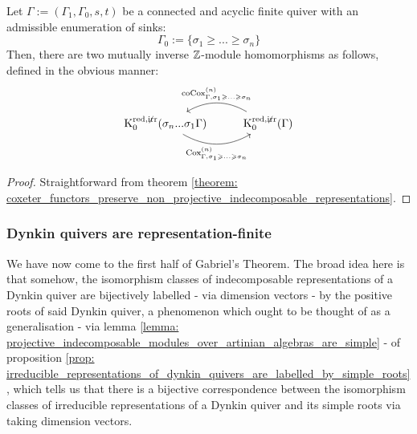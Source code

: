             \begin{corollary} \label{coro: coxeter_functors_and_grothendieck_groups}
                Let $\Gamma := (\Gamma_1, \Gamma_0, s, t)$ be a connected and acyclic finite quiver with an admissible enumeration of sinks:
                    $$\Gamma_0 := \{\sigma_1 \geq ... \geq \sigma_n\}$$
                Then, there are two mutually inverse $\mathbb{Z}$-module homomorphisms as follows, defined in the obvious manner:
                    $$
                        \begin{tikzcd}
                        	{\K_0^{\red, \not \irr}(\sigma_n ... \sigma_1 \Gamma)} & {\K_0^{\red, \not \irr}(\Gamma)}
                        	\arrow[""{name=0, anchor=center, inner sep=0}, "{\Cox_{\Gamma, \sigma_1 \geq ...\geq \sigma_n}^{(n)}}"', bend right, from=1-1, to=1-2]
                        	\arrow[""{name=1, anchor=center, inner sep=0}, "{\co\Cox_{\Gamma, \sigma_1 \geq ...\geq \sigma_n}^{(n)}}"', bend right, from=1-2, to=1-1]
                        \end{tikzcd}
                    $$
            \end{corollary}
                \begin{proof}
                    Straightforward from theorem \ref{theorem: coxeter_functors_preserve_non_projective_indecomposable_representations}. 
                \end{proof}
            
        \subsubsection{Dynkin quivers are representation-finite}
            We have now come to the first half of Gabriel's Theorem. The broad idea here is that somehow, the isomorphism classes of indecomposable representations of a Dynkin quiver are bijectively labelled - via dimension vectors - by the positive roots of said Dynkin quiver, a phenomenon which ought to be thought of as a generalisation - via lemma \ref{lemma: projective_indecomposable_modules_over_artinian_algebras_are_simple} - of proposition \ref{prop: irreducible_representations_of_dynkin_quivers_are_labelled_by_simple_roots}, which tells us that there is a bijective correspondence between the isomorphism classes of irreducible representations of a Dynkin quiver and its simple roots via taking dimension vectors. 
            
